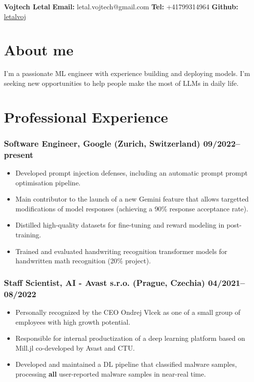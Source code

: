 \documentclass[10pt]{article}
\begin{document}
\clearpage
\thispagestyle{empty}
{\center\bfseries\huge Vojtech Letal}
\hfill
{\bf Email:} letal.vojtech@gmail.com
{\bf Tel:} +41799314964
{\bf Github:} \href{http://github.com/letalvoj}{letalvoj}

\section*{About me}
I'm a passionate ML engineer with experience building and deploying models. I'm seeking new opportunities to help people make the most of LLMs in daily life.

\section*{Professional Experience}
\subsubsection*{\bf Software Engineer, Google (Zurich, Switzerland) \hfill 09/2022--present}
    \begin{itemize}
        \setlength\itemsep{-0.25em}
        \item Developed prompt injection defenses, including an automatic prompt prompt optimisation pipeline.
        \item Main contributor to the launch of a new Gemini feature that allows targetted modifications of model responses (achieving a 90\% response acceptance rate).
        \item Distilled high-quality datasets for fine-tuning and reward modeling in post-training.
        \item Trained and evaluated handwriting recognition transformer models for handwritten math recognition (20\% project).
    \end{itemize}

\subsubsection*{\bf Staff Scientist, AI - Avast s.r.o. (Prague, Czechia) \hfill 04/2021--08/2022}
	 \begin{itemize}
		\setlength\itemsep{-0.25em}
		\item Personally recognized by the CEO Ondrej Vlcek as one of a small group of employees with high growth potential.
		\item Responsible for internal productization of a deep learning platform based on Mill.jl co-developed by Avast and CTU.
		\item Developed and maintained a DL pipeline that classified malware samples, processing \textbf{all} user-reported malware samples in near-real time.
	 \end{itemize}
\end{document}
